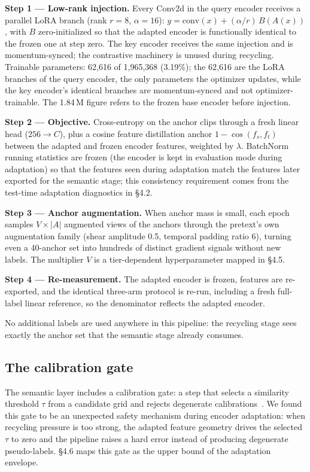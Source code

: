 \documentclass[preprint,12pt,number]{elsarticle}
\begin{document}
\textbf{Step 1 --- Low-rank injection.} Every Conv2d in the query encoder receives a
parallel LoRA branch (rank $r = 8$, $\alpha = 16$): $y = \mathrm{conv}(x) + (\alpha/r)\,B(A(x))$,
with $B$ zero-initialized so that the adapted encoder is functionally
identical to the frozen one at step zero. The key encoder receives the same
injection and is momentum-synced; the contrastive machinery is unused during
recycling. Trainable parameters: 62,616 of 1,965,368 (3.19\%); the 62,616 are
the LoRA branches of the query encoder, the only parameters the optimizer
updates, while the key encoder's identical branches are momentum-synced and
not optimizer-trainable. The 1.84\,M figure refers to the frozen base encoder
before injection.

\textbf{Step 2 --- Objective.} Cross-entropy on the anchor clips through a fresh
linear head ($256 \rightarrow C$), plus a cosine feature distillation anchor
$1-\cos(f_s, f_t)$ between the adapted and frozen encoder features,
weighted by $\lambda$. BatchNorm~\cite{batchnorm} running statistics are frozen (the encoder is kept
in evaluation mode during adaptation) so that the features seen during
adaptation match the features later exported for the semantic stage; this
consistency requirement comes from the test-time adaptation diagnostics
in \S4.2.

\textbf{Step 3 --- Anchor augmentation.} When anchor mass is small, each epoch
samples $V\times|A|$ augmented views of the anchors through the pretext's own
augmentation family (shear amplitude 0.5, temporal padding ratio 6), turning
even a 40-anchor set into hundreds of distinct gradient signals without new
labels. The multiplier $V$ is a tier-dependent hyperparameter mapped in \S4.5.

\textbf{Step 4 --- Re-measurement.} The adapted encoder is frozen, features are
re-exported, and the identical three-arm protocol is re-run, including a
fresh full-label linear reference, so the denominator reflects the adapted
encoder.

No additional labels are used anywhere in this pipeline: the recycling stage
sees exactly the anchor set that the semantic stage already consumes.

\subsection{The calibration gate}

The semantic layer includes a calibration gate: a step that selects a
similarity threshold $\tau$ from a candidate grid and rejects degenerate
calibrations~\cite{rejection}. We
found this gate to be an unexpected safety mechanism during encoder
adaptation: when recycling pressure is too strong, the adapted feature
geometry drives the selected $\tau$ to zero and the pipeline raises a hard error
instead of producing degenerate pseudo-labels. \S4.6 maps this gate as the
upper bound of the adaptation envelope.
\end{document}
